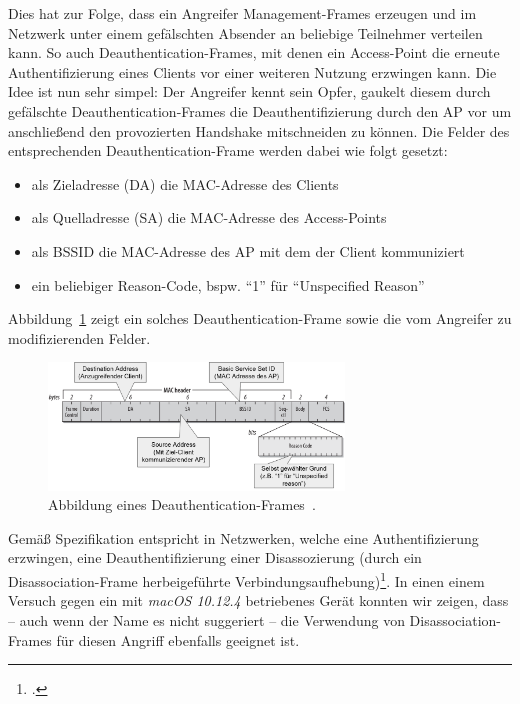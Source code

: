 Dies hat zur Folge, dass ein Angreifer Management-Frames erzeugen und im Netzwerk unter einem gefälschten Absender an beliebige Teilnehmer verteilen kann.
So auch Deauthentication-Frames, mit denen ein Access-Point die erneute Authentifizierung eines Clients vor einer weiteren Nutzung erzwingen kann. Die Idee ist nun sehr simpel: Der Angreifer kennt sein Opfer, gaukelt diesem durch gefälschte Deauthentication-Frames die Deauthentifizierung durch den AP vor um anschließend den provozierten Handshake mitschneiden zu können.
Die Felder des entsprechenden Deauthentication-Frame werden dabei wie folgt gesetzt:
\begin{itemize}
	\item als Zieladresse (DA) die MAC-Adresse des Clients
	\item als Quelladresse (SA) die MAC-Adresse des Access-Points
	\item als BSSID die MAC-Adresse des AP mit dem der Client kommuniziert
	\item ein beliebiger Reason-Code, bspw. \enquote{1} für \enquote{Unspecified Reason} \cite[S. 442]{ieee802.11}
\end{itemize}
Abbildung~\ref{fig:deauth-attack} zeigt ein solches Deauthentication-Frame sowie die vom Angreifer zu modifizierenden Felder.

\begin{figure}[ht]
	\centering
	\includegraphics[width=0.7\textwidth]{graphics/deauth-attack}
	\caption[Deauthentication-Frame]{Abbildung eines Deauthentication-Frames~\cite{deauthframe}.}
	\label{fig:deauth-attack}
\end{figure}

Gemäß Spezifikation entspricht in Netzwerken, welche eine Authentifizierung erzwingen, eine Deauthentifizierung einer Disassozierung (durch ein Disassociation-Frame herbeigeführte Verbindungsaufhebung)\footcite[S. 74, S. 442]{ieee802.11}. In einen einem Versuch gegen ein mit \textit{macOS 10.12.4} betriebenes Gerät konnten wir zeigen, dass -- auch wenn der Name es nicht suggeriert -- die Verwendung von Disassociation-Frames für diesen Angriff ebenfalls geeignet ist.

